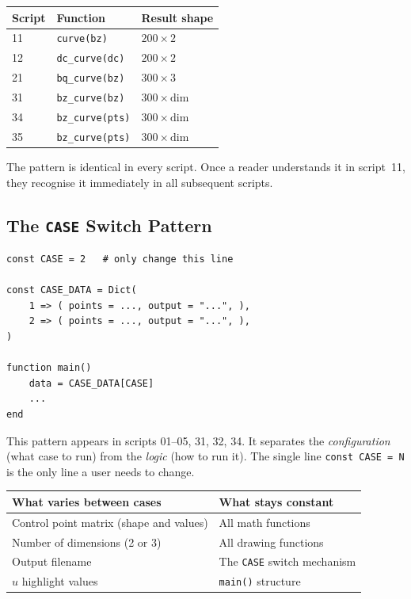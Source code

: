 \documentclass[12pt, a4paper]{article}
\newcommand{\cd}[1]{\texttt{#1}}
\begin{document}
\begin{center}
\begin{tabular}{lll}
\toprule
Script & Function & Result shape \\
\midrule
11 & \cd{curve(bz)} & $200 \times 2$ \\
12 & \cd{dc\_curve(dc)} & $200 \times 2$ \\
21 & \cd{bq\_curve(bz)} & $300 \times 3$ \\
31 & \cd{bz\_curve(bz)} & $300 \times \text{dim}$ \\
34 & \cd{bz\_curve(pts)} & $300 \times \text{dim}$ \\
35 & \cd{bz\_curve(pts)} & $300 \times \text{dim}$ \\
\bottomrule
\end{tabular}
\end{center}

The pattern is identical in every script.
Once a reader understands it in script~11, they
recognise it immediately in all subsequent scripts.

\subsection{The \texttt{CASE} Switch Pattern}

\begin{verbatim}
const CASE = 2   # only change this line

const CASE_DATA = Dict(
    1 => ( points = ..., output = "...", ),
    2 => ( points = ..., output = "...", ),
)

function main()
    data = CASE_DATA[CASE]
    ...
end
\end{verbatim}

This pattern appears in scripts 01--05, 31, 32, 34.
It separates the \emph{configuration} (what case to run)
from the \emph{logic} (how to run it).
The single line \cd{const CASE = N} is the only line
a user needs to change.

\begin{center}
\begin{tabular}{ll}
\toprule
What varies between cases & What stays constant \\
\midrule
Control point matrix (shape and values) &
  All math functions \\
Number of dimensions (2 or 3) &
  All drawing functions \\
Output filename &
  The \cd{CASE} switch mechanism \\
$u$ highlight values &
  \cd{main()} structure \\
\bottomrule
\end{tabular}
\end{center}
\end{document}
